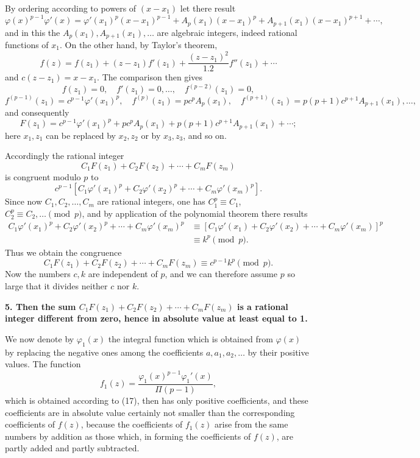 \documentclass[11pt]{article}
\begin{document}
By ordering according to powers of $(x-x_1)$ let there result
\[
\varphi(x)^{p-1}\varphi'(x)=
\varphi'(x_1)^p(x-x_1)^{p-1}
+A_p(x_1)(x-x_1)^p
+A_{p+1}(x_1)(x-x_1)^{p+1}+\cdots,
\]
and in this the $A_p(x_1),A_{p+1}(x_1),\ldots$ are algebraic integers, indeed rational functions of $x_1$. On the other hand, by Taylor's theorem,
\[
f(z)=f(z_1)+(z-z_1)f'(z_1)+\frac{(z-z_1)^2}{1.2}f''(z_1)+\cdots
\]
and $c(z-z_1)=x-x_1$. The comparison then gives
\[
f(z_1)=0,\quad f'(z_1)=0,\ldots,\quad f^{(p-2)}(z_1)=0,
\]
\[
f^{(p-1)}(z_1)=c^{p-1}\varphi'(x_1)^p,\quad
f^{(p)}(z_1)=pc^pA_p(x_1),\quad
f^{(p+1)}(z_1)=p(p+1)c^{p+1}A_{p+1}(x_1),\ldots,
\]
and consequently
\[
F(z_1)=c^{p-1}\varphi'(x_1)^p+pc^pA_p(x_1)+p(p+1)c^{p+1}A_{p+1}(x_1)+\cdots;
\]
here $x_1,z_1$ can be replaced by $x_2,z_2$ or by $x_3,z_3$, and so on.

Accordingly the rational integer
\[
C_1F(z_1)+C_2F(z_2)+\cdots+C_mF(z_m)
\]
is congruent modulo $p$ to
\[
c^{p-1}\left[C_1\varphi'(x_1)^p+C_2\varphi'(x_2)^p+\cdots+C_m\varphi'(x_m)^p\right].
\]
Since now $C_1,C_2,\ldots,C_m$ are rational integers, one has $C_1^p\equiv C_1$, $C_2^p\equiv C_2,\ldots\pmod p$, and by application of the polynomial theorem there results
\[
\begin{aligned}
C_1\varphi'(x_1)^p+C_2\varphi'(x_2)^p+\cdots+C_m\varphi'(x_m)^p
&\equiv
\left[C_1\varphi'(x_1)+C_2\varphi'(x_2)+\cdots+C_m\varphi'(x_m)\right]^p\\
&\equiv k^p \pmod p.
\end{aligned}
\]
Thus we obtain the congruence
\begin{equation}\tag{18}
C_1F(z_1)+C_2F(z_2)+\cdots+C_mF(z_m)\equiv c^{p-1}k^p\pmod p.
\end{equation}
Now the numbers $c,k$ are independent of $p$, and we can therefore assume $p$ so large that it divides neither $c$ nor $k$.

\textbf{5. Then the sum $C_1F(z_1)+C_2F(z_2)+\cdots+C_mF(z_m)$ is a rational integer different from zero, hence in absolute value at least equal to 1.}

We now denote by $\varphi_1(x)$ the integral function which is obtained from $\varphi(x)$ by replacing the negative ones among the coefficients $a,a_1,a_2,\ldots$ by their positive values. The function
\[
f_1(z)=\frac{\varphi_1(x)^{p-1}\varphi_1'(x)}{\Pi(p-1)},
\]
which is obtained according to (17), then has only positive coefficients, and these coefficients are in absolute value certainly not smaller than the corresponding coefficients of $f(z)$, because the coefficients of $f_1(z)$ arise from the same numbers by addition as those which, in forming the coefficients of $f(z)$, are partly added and partly subtracted.
\end{document}

